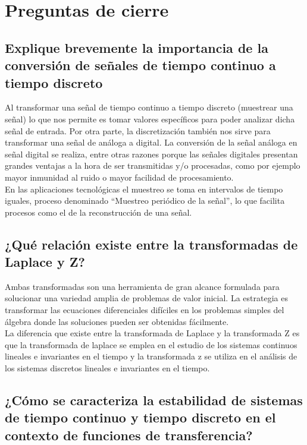 \section{Preguntas de cierre}

\subsection{Explique brevemente la importancia de la conversión de señales de tiempo continuo a tiempo discreto}

Al transformar una señal de tiempo continuo a tiempo discreto (muestrear una señal) lo que nos permite es tomar valores específicos para poder analizar dicha señal de entrada. Por otra parte, la discretización también nos sirve para transformar una señal de análoga a digital. La conversión de la señal análoga en señal digital se realiza, entre otras razones porque las señales digitales presentan grandes ventajas a la hora de ser transmitidas y/o procesadas, como por ejemplo mayor inmunidad al ruido o mayor facilidad de procesamiento.\\
En las aplicaciones tecnológicas el muestreo se toma en intervalos de tiempo iguales, proceso denominado “Muestreo periódico de la señal”, lo que facilita procesos como el de la reconstrucción de una señal.


\subsection{¿Qué relación existe entre la transformadas de Laplace y Z?}
Ambas transformadas son una herramienta de gran alcance formulada para solucionar una variedad amplia de problemas de valor inicial. La estrategia es transformar las ecuaciones diferenciales difíciles en los problemas simples del álgebra donde las soluciones pueden ser obtenidas fácilmente.\\
La diferencia que existe entre la transformada de Laplace y la transformada Z es que la transformada de laplace se emplea en el estudio de los sistemas continuos lineales e invariantes en el tiempo y la transformada z se utiliza en el análisis de los sistemas discretos lineales e invariantes en el tiempo.
		
\subsection{¿Cómo se caracteriza la estabilidad de sistemas de tiempo continuo y tiempo discreto en el contexto de funciones de transferencia?}

